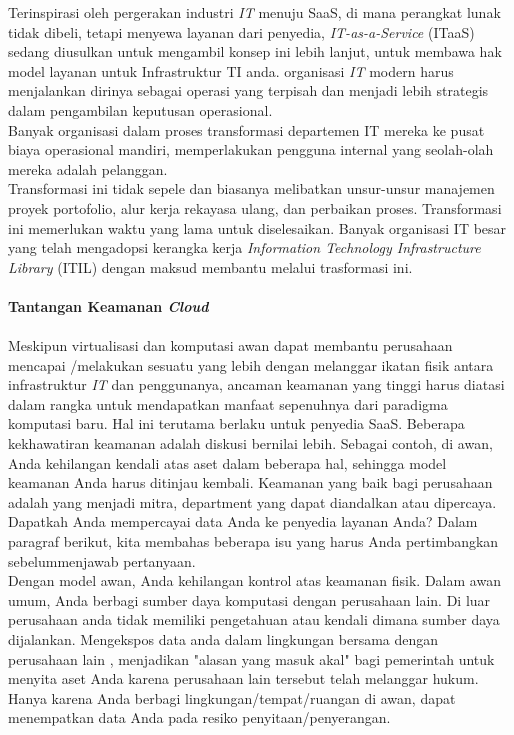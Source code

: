 Terinspirasi oleh pergerakan industri \textit{IT} menuju SaaS, di mana perangkat lunak  tidak  dibeli, tetapi menyewa layanan dari penyedia, \textit{IT-as-a-Service} (ITaaS) sedang diusulkan untuk mengambil konsep ini lebih lanjut, untuk membawa hak model layanan untuk Infrastruktur TI anda. organisasi \textit{IT} modern harus menjalankan dirinya sebagai operasi yang terpisah dan menjadi  lebih strategis dalam pengambilan keputusan operasional.\\
Banyak organisasi dalam proses transformasi departemen IT mereka ke pusat biaya  operasional mandiri, memperlakukan pengguna internal yang seolah-olah mereka adalah pelanggan.\\
\tab Transformasi ini tidak sepele dan biasanya melibatkan unsur-unsur manajemen proyek portofolio, alur kerja rekayasa ulang, dan perbaikan proses. Transformasi ini memerlukan waktu yang lama untuk diselesaikan. Banyak organisasi IT besar yang telah mengadopsi  kerangka kerja \textit{Information Technology Infrastructure Library} (ITIL) dengan maksud membantu melalui trasformasi ini.\\\\
\textbf{Tantangan Keamanan \textit{Cloud}}\\\\
Meskipun virtualisasi dan komputasi awan dapat membantu perusahaan mencapai /melakukan sesuatu yang lebih dengan melanggar ikatan fisik antara infrastruktur \textit{IT} dan penggunanya, ancaman keamanan yang tinggi harus diatasi dalam rangka untuk mendapatkan manfaat sepenuhnya dari paradigma komputasi baru. Hal ini terutama berlaku untuk penyedia SaaS. Beberapa kekhawatiran keamanan adalah diskusi bernilai lebih. Sebagai contoh, di awan, Anda kehilangan kendali atas aset dalam beberapa hal, sehingga model keamanan Anda harus ditinjau kembali. Keamanan yang baik bagi perusahaan adalah yang menjadi mitra, department yang dapat diandalkan atau dipercaya. Dapatkah Anda mempercayai data Anda ke penyedia layanan Anda? Dalam paragraf berikut, kita membahas beberapa isu yang harus Anda pertimbangkan sebelummenjawab  pertanyaan.\\
\tab Dengan model awan, Anda kehilangan kontrol atas keamanan fisik. Dalam awan umum, Anda berbagi sumber daya komputasi dengan perusahaan lain. Di luar perusahaan anda tidak memiliki pengetahuan atau kendali dimana sumber daya dijalankan. Mengekspos data anda dalam lingkungan bersama dengan perusahaan lain , menjadikan "alasan yang masuk  akal" bagi pemerintah untuk menyita aset Anda karena perusahaan lain tersebut telah melanggar hukum. Hanya karena Anda berbagi lingkungan/tempat/ruangan di awan, dapat menempatkan data Anda pada resiko penyitaan/penyerangan.\\

